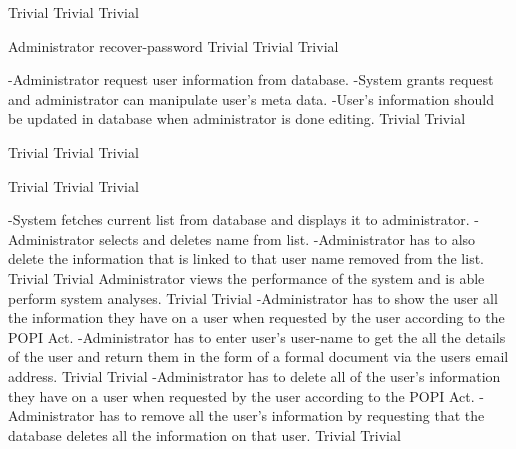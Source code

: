   	{Trivial}
	 	{Trivial}
  	{Trivial}
	  
\FuncReq
    {Administrator recover-password}		
		{Trivial}
  	{Trivial}
		{Trivial}
 
		{-Administrator request user information from database.
		-System grants request and administrator can manipulate user's meta data.
		-User's information should be updated in database when administrator is done editing.}
		{Trivial}
 		{Trivial}
       
		{Trivial}
		{Trivial}
  	{Trivial}
		
		{Trivial}
		{Trivial}
  	{Trivial}
		
		{-System fetches current list from database and displays it to administrator.
		-Administrator selects and deletes name from list.
		-Administrator has to also delete the information that is linked to that user 					 			 name removed from the list.}
		{Trivial}
       	 	{Trivial}
        {Administrator views the performance of the system and is able perform system analyses.}
        {Trivial}
        {Trivial}
	{-Administrator has to show the user all the information they have on a user when requested by the user according to the POPI 		 Act.
	-Administrator has to enter user's user-name to get the all the details of the user and return them in the form of a formal 		  document via the users email address.}
	{Trivial}
	{Trivial}
	{-Administrator has to delete all of the user's information they have on a user when requested by the user according to the POPI 	  Act.
	-Administrator has to remove all the user's information by requesting that the database deletes all the information on that 		 user.}
	{Trivial}
	{Trivial}

